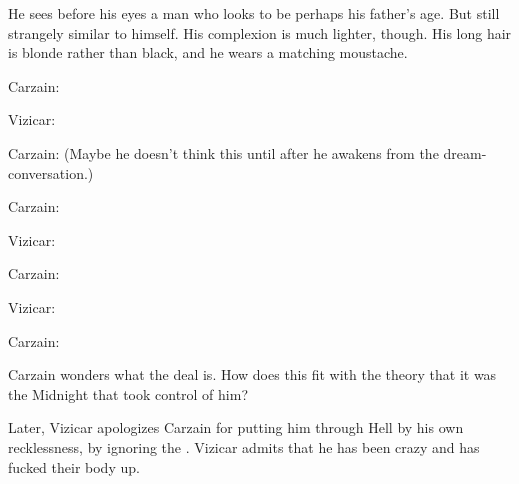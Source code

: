 He sees before his eyes a man who looks to be perhaps his father's age. 
But still strangely similar to himself. 
His complexion is much lighter, though. 
His long hair is blonde rather than black, and he wears a matching moustache. 

Carzain: 

Vizicar: 

Carzain: 
(Maybe he doesn't think this until after he awakens from the dream-conversation.)

Carzain: 

Vizicar: 

Carzain: 

Vizicar: 

Carzain: 

Carzain wonders what the deal is. 
How does this fit with the theory that it was the Midnight \Qliphoth{} that took control of him? 

Later, Vizicar apologizes Carzain for putting him through Hell by his own recklessness, by ignoring the . 
Vizicar admits that he has been crazy and has fucked their body up. 









